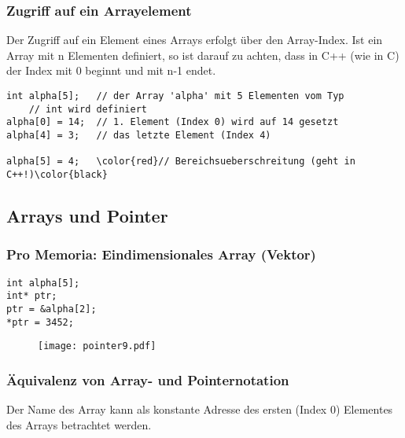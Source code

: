 \subsubsection{Zugriff auf ein Arrayelement\hfill}
\label{sec:unterunterabschnitt}
\begin{hinweis}
Der Zugriff auf ein Element eines Arrays erfolgt über den Array-Index. Ist ein Array mit n Elementen definiert, so ist darauf zu achten, dass in C++ (wie in C) der Index mit 0 beginnt und mit n-1 endet.
\end{hinweis}
\noindent
\begin{minipage}{\linewidth}
\begin{lstlisting}
int alpha[5];	// der Array 'alpha' mit 5 Elementen vom Typ
	// int wird definiert
alpha[0] = 14;	// 1. Element (Index 0) wird auf 14 gesetzt
alpha[4] = 3;	// das letzte Element (Index 4)

alpha[5] = 4;	\color{red}// Bereichsueberschreitung (geht in C++!)\color{black}
\end{lstlisting}
\end{minipage}


\subsection{Arrays und Pointer\hfill}
\label{sec:unterabschnitt}

\subsubsection{Pro Memoria: Eindimensionales Array (Vektor)\hfill}
\label{sec:unterunterabschnitt}
\noindent
\begin{minipage}{\linewidth}
\begin{lstlisting}
int alpha[5];
int* ptr;
ptr = &alpha[2];
*ptr = 3452;
\end{lstlisting}
\end{minipage}

\begin{figure}[h]
	\centering
	\texttt{[image: pointer9.pdf]}
\end{figure}

\subsubsection{Äquivalenz von Array- und Pointernotation\hfill}
\label{sec:unterunterabschnitt}
Der Name des Array kann als konstante Adresse des ersten (Index 0) Elementes des Arrays betrachtet werden.\\

